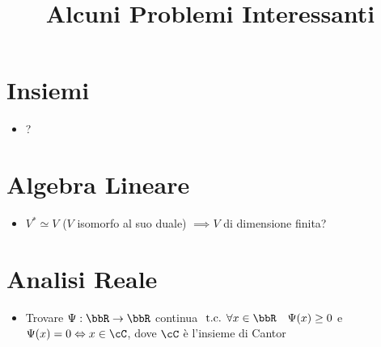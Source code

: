 \documentclass[a4paper,NoNotes,GeneralMath]{stdmdoc}
\begin{document}
	\title{Alcuni Problemi Interessanti}
	\autodate

	\section*{Insiemi}
	\begin{itemize}
		\item ?
	\end{itemize}

	\section*{Algebra Lineare}
	\begin{itemize}
		\item $V^{*} \simeq V$ ($V$ isomorfo al suo duale) $\implies V$ di dimensione finita?
	\end{itemize}

	\section*{Analisi Reale}
	\begin{itemize}
		\item Trovare $\Psi: \bbR\rar\bbR$ continua $\tc \forall x\in\bbR \quad \Psi(x)\ge 0$ e $\Psi(x) = 0 \sse x \in \cC$, dove $\cC$ è l'insieme di Cantor
	\end{itemize}
\end{document}
